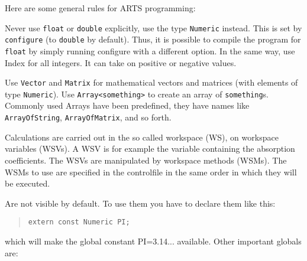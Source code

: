 \label{sec:development:conv}

Here are some general rules for ARTS programming:

\levelc{} Never use \verb|float| or \verb|double| explicitly, use the
type \verb|Numeric| instead.  This is set by \verb|configure| (to
\verb|double| by default). Thus, it is possible to compile the program
for \verb|float| by simply running configure with a different option.
%
%
In the same way, use Index for all integers. It can take on positive
or negative values.

\levelc{} Use \verb|Vector| and \verb|Matrix| for mathematical vectors
and matrices (with elements of type \verb|Numeric|). Use
\verb|Array<something>| to create an array of \verb|something|s. Commonly
used Arrays have been predefined, they have names like
\verb|ArrayOfString|, \verb|ArrayOfMatrix|, and so forth.

Calculations are carried out in the so called workspace (WS), on
workspace variables (WSVs). A WSV is for example the variable
containing the absorption coefficients. The WSVs are manipulated by 
workspace methods (WSMs). The WSMs to use are specified in the
controlfile in the same order in which they will be
executed. 

   Are not visible by default. To use them you have to declare them
   like this:
   \begin{quote}
   \verb|extern const Numeric PI;|
   \end{quote}
   which will make the global constant PI=3.14... available. Other important globals are:

